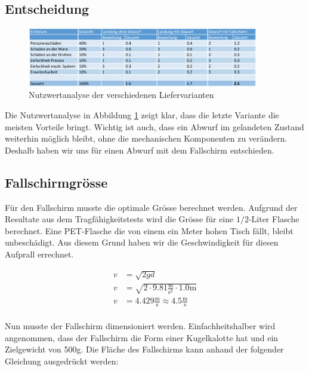 \subsection{Entscheidung}

\begin{figure}[H]
	\centering
	\includegraphics[width=0.9\textwidth] {images/nutzwertanalyse_abwurf.png} 
	\caption{Nutzwertanalyse der verschiedenen Liefervarianten}
	\label{fig:nutzwertanalyse_abwurf}
\end{figure}


Die Nutzwertanalyse in Abbildung \ref{fig:nutzwertanalyse_abwurf} zeigt klar, dass die letzte Variante die meisten Vorteile bringt. Wichtig ist auch, dass ein Abwurf im gelandeten Zustand weiterhin möglich bleibt, ohne die mechanischen Komponenten zu verändern. Deshalb haben wir uns für einen Abwurf mit dem Fallschirm entschieden.

\subsection{Fallschirmgrösse}

Für den Fallschirm musste die optimale Grösse berechnet werden. Aufgrund der Resultate aus dem Tragfähigkeitstests wird die Grösse für eine $1/2$-Liter Flasche berechnet.
Eine PET-Flasche die von einem ein Meter hohen Tisch fällt, bleibt unbeschädigt. Aus diesem Grund haben wir die Geschwindigkeit für diesen Aufprall errechnet.

\begin{equation}
\label{eq:pet}
\begin{split}
v &= \sqrt{2gd} \\
v &= \sqrt{2 \cdot 9.81\frac{\text{m}}{\text{s}^2} \cdot 1.0\text{m}} \\
v &= 4.429 \frac{\text{m}}{\text{s}} \approx 4.5 \frac{\text{m}}{\text{s}} \\
\end{split}
\end{equation}

Nun musste der Fallschirm dimensioniert werden. 
Einfachheitshalber wird angenommen, dass der Fallschirm die Form einer Kugelkalotte hat und ein Zielgewicht von 500g. Die Fläche des Fallschirms kann anhand der folgender Gleichung ausgedrückt werden:


